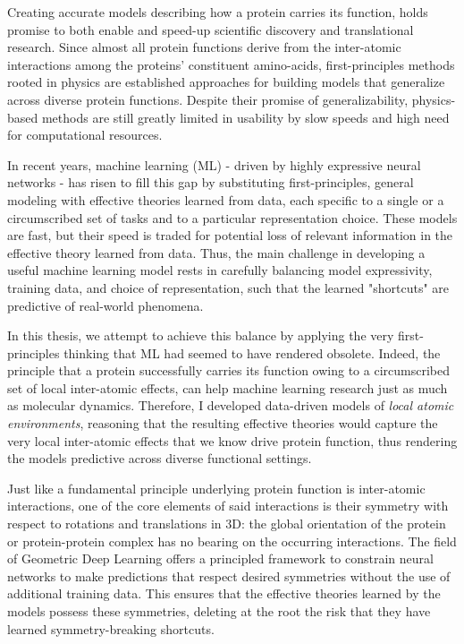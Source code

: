 
Creating accurate models describing how a protein carries its function, holds promise to both enable and speed-up
scientific discovery and translational research.
Since almost all protein functions derive from the inter-atomic interactions among the proteins' constituent amino-acids,
first-principles methods rooted in physics are established approaches for building models that generalize across
diverse protein functions.
Despite their promise of generalizability, physics-based methods are still greatly limited in usability
by slow speeds and high need for computational resources.

In recent years, machine learning (ML) - driven by highly expressive neural networks - has risen to fill
this gap by substituting first-principles, general modeling with effective theories learned from data,
each specific to a single or a circumscribed set of tasks and to a particular representation choice.
These models are fast, but their speed is traded for potential loss of relevant information in the
effective theory learned from data.
Thus, the main challenge in developing a useful machine learning model rests in carefully balancing
model expressivity, training data, and choice of representation, such that the learned "shortcuts" are predictive
of real-world phenomena.

In this thesis, we attempt to achieve this balance by applying the very first-principles thinking
that ML had seemed to have rendered obsolete.
Indeed, the principle that a protein successfully carries its function owing to a circumscribed set of
local inter-atomic effects, can help machine learning research just as much as molecular dynamics.
Therefore, I developed data-driven models of \textit{local atomic environments},
reasoning that the resulting effective theories would capture the very local inter-atomic effects that we know drive
protein function, thus rendering the models predictive across diverse functional settings.

Just like a fundamental principle underlying protein function is inter-atomic interactions, one of the core elements
of said interactions is their symmetry with respect to rotations and translations in 3D: the global orientation of the
protein or protein-protein complex has no bearing on the occurring interactions.
The field of Geometric Deep Learning offers a principled framework to constrain neural networks to make predictions
that respect desired symmetries without the use of additional training data.
This ensures that the effective theories learned by the models possess these symmetries, deleting at the root the risk
that they have learned symmetry-breaking shortcuts.

